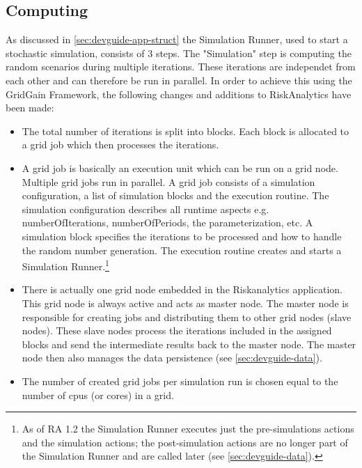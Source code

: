 \subsection{Computing}
\label{sec:devguide-computing}
As discussed in \ref{sec:devguide-app-struct} the Simulation Runner, used to start a stochastic simulation, consists of 3 steps. The "Simulation" step
is computing the random scenarios during multiple iterations. These iterations are independet from each other and can therefore
be run in parallel.
In order to achieve this using the GridGain Framework, the following changes and additions to RiskAnalytics have been made:
\begin{itemize}
 \item The total number of iterations is split into blocks. Each block is allocated to a grid job which then processes the iterations.
 \item A grid job is basically an execution unit which can be run on a grid node. Multiple grid jobs run in parallel.
A grid job consists of a simulation configuration, a list of simulation blocks and the execution routine.
The simulation configuration describes all runtime aspects e.g. numberOfIterations, numberOfPeriods, the parameterization, etc.
A simulation block specifies the iterations to be processed and how to handle the random number generation.
The execution routine creates and starts a Simulation Runner.\footnote{As of RA 1.2 the Simulation Runner executes just the pre-simulations
actions and the simulation actions; the post-simulation actions are no longer part of the Simulation Runner and are called later (see \ref{sec:devguide-data}).}
 \item There is actually one grid node embedded in the Riskanalytics application. This grid node is always active and acts as
master node. The master node is responsible for creating jobs and distributing them to other grid nodes (slave nodes).
These slave nodes process the iterations included in the assigned blocks and send the intermediate results back to the master node.
The master node then also manages the data persistence (see \ref{sec:devguide-data}).
 \item The number of created grid jobs per simulation run is chosen equal to the number of cpus (or cores) in a grid.
\end{itemize}

